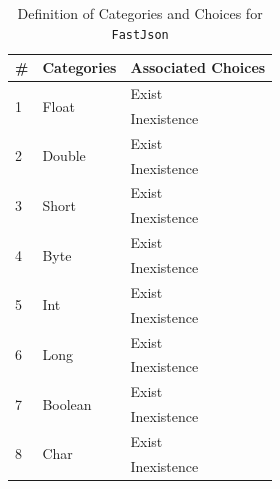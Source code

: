 \documentclass[10pt,journal,compsoc]{IEEEtran}
\begin{document}
\begin{table}[htb]
  \caption{Definition of Categories and Choices for \texttt{FastJson}}
  \label{table:categoriesoffastjson}
  \centering
  \begin{tabular}{lll} \toprule
  \#                 &Categories                                                &Associated Choices      \\ \midrule
  \multirow{2}{*}{1} &\multirow{2}{*}{Float}                                     &Exist \\
                     &                                                          &Inexistence \\ \midrule
  \multirow{2}{*}{2} &\multirow{2}{*}{Double}                                    &Exist\\
                     &                                                          &Inexistence \\ \midrule
  \multirow{2}{*}{3} &\multirow{2}{*}{Short}                                     &Exist\\
                     &                                                          &Inexistence \\ \midrule
  \multirow{2}{*}{4} &\multirow{2}{*}{Byte}                                      &Exist\\
                     &                                                          &Inexistence \\ \midrule
  \multirow{2}{*}{5} &\multirow{2}{*}{Int}                                       &Exist\\
                     &                                                          &Inexistence \\ \midrule
  \multirow{2}{*}{6} &\multirow{2}{*}{Long}                                      &Exist\\
                     &                                                          &Inexistence \\ \midrule
  \multirow{2}{*}{7} &\multirow{2}{*}{Boolean}                                   &Exist\\
                     &                                                          &Inexistence\\ \midrule
  \multirow{2}{*}{8} &\multirow{2}{*}{Char}                                      &Exist\\
                     &                                                          &Inexistence\\ \midrule

\end{tabular}
\end{table}
\end{document}

